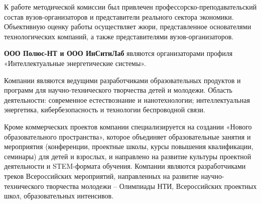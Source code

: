 К работе методической комиссии был привлечен профессорско-преподавательский состав вузов-организаторов и представители реального сектора экономики. Объективную оценку работы осуществляет жюри, представленное основателями технологических компаний, а также представителями вузов-организаторов.  

\textbf{ООО Полюс-НТ и ООО ИнСитиЛаб} являются организаторами профиля «Интеллектуальные энергетические системы».

Компании являются ведущими разработчиками образовательных продуктов и программ для научно-технического творчества детей и молодежи. Область деятельности: современное естествознание и нанотехнологии; интеллектуальная энергетика, кибербезопасность и технологии беспроводной связи. 

Кроме коммерческих проектов компании специализируется на создании «Нового образовательного пространства», которое объединяет образовательные занятия и мероприятия (конференции, проектные школы, курсы повышения квалификации, семинары) для детей и взрослых, и направлено на развитие культуры проектной деятельности и STEM-формата обучения. Компании являются разработчиками треков Всероссийских мероприятий, направленных на развитие научно-технического творчества молодежи – Олимпиады НТИ, Всероссийских проектных школ, образовательных интенсивов.
